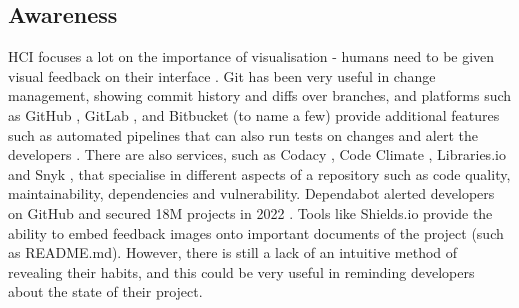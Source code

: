 \documentclass{mprop}
\begin{document}
\subsection{Awareness}%

HCI focuses a lot on the importance of visualisation - humans need to be given visual feedback on their interface \cite{liCategorisationVisualisationMethods2016}. Git \cite{Git} has been very useful in change management, showing commit history and diffs over branches, and platforms such as GitHub \cite{GitHubLetBuild}, GitLab \cite{OneDevOpsPlatform}, and Bitbucket \cite{BitbucketGitSolution} (to name a few) provide additional features such as automated pipelines that can also run tests on changes and alert the developers \cite{FeaturesGitHubActionsa,GitLabCICD,atlassianBitbucketPipelinesContinuous}. There are also services, such as Codacy \cite{DevOpsIntelligencePlatforma}, Code Climate \cite{DataDrivenEngineeringIntelligence}, Libraries.io \cite{LibrariesOpenSourcea} and Snyk \cite{SnykDeveloperSecurity2020a}, that specialise in different aspects of a repository such as code quality, maintainability, dependencies and vulnerability. Dependabot \cite{Dependabot} alerted developers on GitHub and secured 18M projects in 2022 \cite{GlobalDeveloperCommunity}. Tools like Shields.io \cite{ShieldsIoQualitya} provide the ability to embed feedback images onto important documents of the project (such as README.md). However, there is still a lack of an intuitive method of revealing their habits, and this could be very useful in reminding developers about the state of their project.
\end{document}
